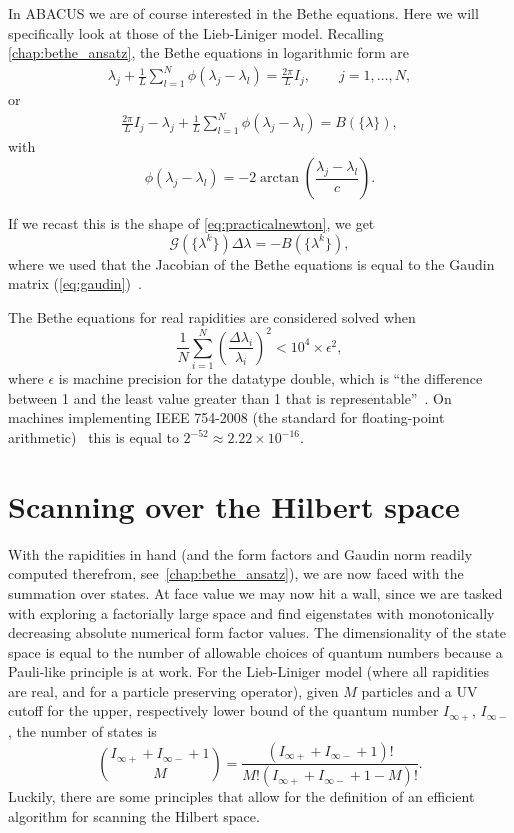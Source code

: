 \documentclass[11pt, a4paper]{report} %
\begin{document}
In ABACUS we are of course interested in the Bethe equations.
Here we will specifically look at those of the Lieb-Liniger model.
Recalling \cref{chap:bethe_ansatz}, the Bethe equations in logarithmic form are 
\begin{align}
  \lambda_j + \frac{1}{L} \sum_{l=1}^N \phi(\lambda_j - \lambda_l) = \frac{2\pi}{L}I_j, \qquad j = 1,\ldots,N,
\end{align}
or
\begin{align}
  \frac{2\pi}{L}I_j - \lambda_j + \frac{1}{L} \sum_{l=1}^N \phi(\lambda_j - \lambda_l) = B(\{\lambda\}),
\end{align}
with
\begin{equation}
  \phi(\lambda_j - \lambda_l) = -2\arctan\left(\frac{\lambda_j-\lambda_l}{c}\right).
\end{equation}

If we recast this is the shape of \cref{eq:practicalnewton}, we get
\begin{equation}
  \mathcal{G}(\{\lambda^k\}) \Delta \lambda = -B(\{\lambda^k\}),
\end{equation}
where we used that the Jacobian of the Bethe equations is equal to the Gaudin matrix (\cref{eq:gaudin})~\cite{Caux2009}.

The Bethe equations for real rapidities are considered solved when~\cite{Caux2009}
\begin{equation}
	\frac{1}{N}\sum_{i=1}^{N} \left(\frac{\Delta \lambda_i}{\lambda_i}\right)^2 < 10^4 \times \epsilon^2,
\end{equation}
where \(\epsilon\) is machine precision for the datatype double, which is ``the difference between 1 and the least value greater than 1 that is representable''~\cite{cppstandard2016}.
On machines implementing IEEE 754-2008 (the standard for floating-point arithmetic)~\cite{ieeefp2008} this is equal to \({2^{-52} \approx 2.22 \times 10^{-16}}\).


\section{Scanning over the Hilbert space}

With the rapidities in hand (and the form factors and Gaudin norm readily computed therefrom, see~\cref{chap:bethe_ansatz}), we are now faced with the summation over states.
At face value we may now hit a wall, since we are tasked with exploring a factorially large space and find eigenstates with monotonically decreasing absolute numerical form factor values.
The dimensionality of the state space is equal to the number of allowable choices of quantum numbers because a Pauli-like principle is at work.
For the Lieb-Liniger model (where all rapidities are real, and for a particle preserving operator), given $M$ particles and a UV cutoff for the upper, respectively lower bound of the quantum number $I_{\infty+}$, $I_{\infty-}$, the number of states is~\cite{Caux2009}
\begin{equation}
  \binom{I_{\infty+} + I_{\infty-} + 1}{M} = \frac{(I_{\infty+} + I_{\infty-} + 1)!}{M!(I_{\infty+} + I_{\infty-} + 1 - M)!}.
\end{equation}
Luckily, there are some principles that allow for the definition of an efficient algorithm for scanning the Hilbert space.
\end{document}
